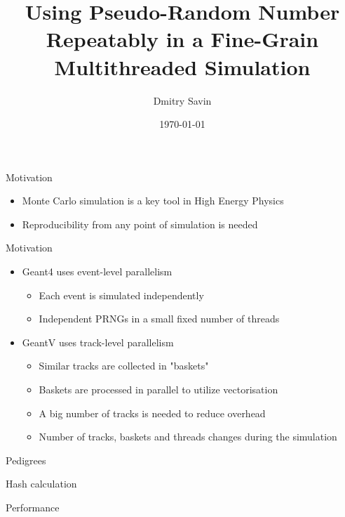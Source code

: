 \documentclass[aspectratio=169, 14pt]{beamer}
\title{Using Pseudo-Random Number Repeatably in a Fine-Grain Multithreaded Simulation}
\author{Dmitry Savin}
\date{\today}
\begin{document}
\begin{large}

 \frame{\titlepage}


 \begin{frame}{Motivation}
 \large
  \begin{itemize}
   \item Monte Carlo simulation is a key tool in High Energy Physics
    \item Reproducibility from any point of simulation is needed
  \end{itemize}
 \end{frame}
 
  \begin{frame}{Motivation}
  \large
  \begin{itemize}
   \item Geant4 uses event-level parallelism
   \begin{itemize}
     \item Each event is simulated independently
     \item Independent PRNGs in a small fixed number of threads
    \end{itemize}
   \item GeantV uses track-level parallelism
    \begin{itemize}
     \item Similar tracks are collected in "baskets"
     \item Baskets are processed in parallel to utilize vectorisation
     \item A big number of tracks is needed to reduce overhead
     \item Number of tracks, baskets and threads changes during the simulation
    \end{itemize}

  \end{itemize}

 \end{frame}

 
 \begin{frame}{Pedigrees}

 
 \end{frame}


 \begin{frame}{Hash calculation}

 
 \end{frame}
 
 
 \begin{frame}{Performance}
 
 \end{frame}

 
 \end{large}
\end{document}
